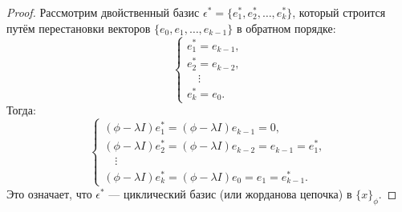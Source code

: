 \begin{proof}
    Рассмотрим двойственный базис \( \epsilon^* = \{e_1^*, e_2^*, \ldots, e_k^*\} \), который строится путём перестановки векторов \( \{e_0, e_1, \ldots, e_{k-1}\} \) в обратном порядке:
    \[
    \begin{cases}
        e_1^* = e_{k-1}, \\
        e_2^* = e_{k-2}, \\
        \quad \vdots \\
        e_k^* = e_0.
    \end{cases}
    \]
    Тогда:
    \[
    \begin{cases}
        (\phi - \lambda I) e_1^* = (\phi - \lambda I) e_{k-1} = 0, \\
        (\phi - \lambda I) e_2^* = (\phi - \lambda I) e_{k-2} = e_{k-1} = e_1^*, \\
        \quad \vdots \\
        (\phi - \lambda I) e_k^* = (\phi - \lambda I) e_0 = e_1 = e_{k-1}^*.
    \end{cases}
    \]
    Это означает, что \( \epsilon^* \) — циклический базис (или жорданова цепочка) в \( \{x\}_{\phi} \).
\end{proof}